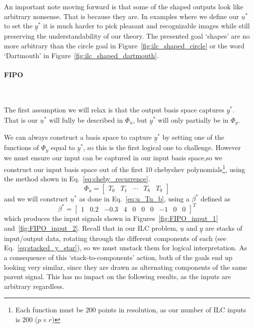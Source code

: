 An important note moving forward is that some of the shaped outputs look like arbitrary nonsense. That is because they are. In examples where we define our $\underline{u}^\ast$ to set the $\underline{y}^\ast$ it is much harder to pick pleasant and recognizable images while still preserving the understandability of our theory. The presented goal `shapes' are no more arbitrary than the circle goal in Figure~\ref{fig:ilc_shaped_circle} or the word `Dartmouth' in Figure~\ref{fig:ilc_shaped_dartmouth}. 

\FloatBarrier\paragraph{\ac{FIPO}}
~\label{par:fipo}

The first assumption we will relax is that the output basis space captures $\underline{y}^\ast$. That is our $\underline{u}^\ast$ will fully be described in $\Phi_u$, but $\underline{y}^\ast$ will only partially be in $\Phi_y$. 

We can always construct a basis space to capture $\underline{y}^\ast$ by setting one of the functions of $\Phi_y$ equal to $\underline{y}^\ast$, so this is the first logical one to challenge. However we must ensure our input can be captured in our input basis space,so we construct our input basis space out of the first 10 chebyshev polynomials\footnote{Each function must be 200 points in resolution,  as our number of ILC inputs is 200 ($p \times r$)}, using the method shown in Eq.~\ref{eq:cheby_recurrence}.
\begin{equation}
    \Phi_u = 
    \begin{bmatrix}
        T_0 & T_1 & \cdots & T_8 & T_9
    \end{bmatrix}
    \label{eq:Tu_in_cheby}
\end{equation}
and we will construct $\underline{u}^\ast$ as done in Eq.~\ref{eq:u_Tu_b}, using a $\beta^\ast$ defined as
\begin{equation}
    \beta^\ast = {\begin{bmatrix}1 & 0.2 & -0.3 & 4 & 0 & 0 & 0 & -1 & 0 & 0\end{bmatrix}}^T
    \label{eq:beta_star_in_basis}
\end{equation}
which produces the input signals shown in Figures~\ref{fig:FIPO_input_1} and~\ref{fig:FIPO_input_2}. Recall that in our ILC problem, $\underline{u}$ and $\underline{y}$ are stacks of input/output data, rotating through the different components of each (see Eq.~\ref{eq:stacked_y_star}), so we must unstack them for logical interpretation. As a consequence of this `stack-to-components' action, both of the goals end up looking very similar, since they are drawn as alternating components of the same parent signal. This has no impact on the following results, as the inputs are arbitrary regardless.

